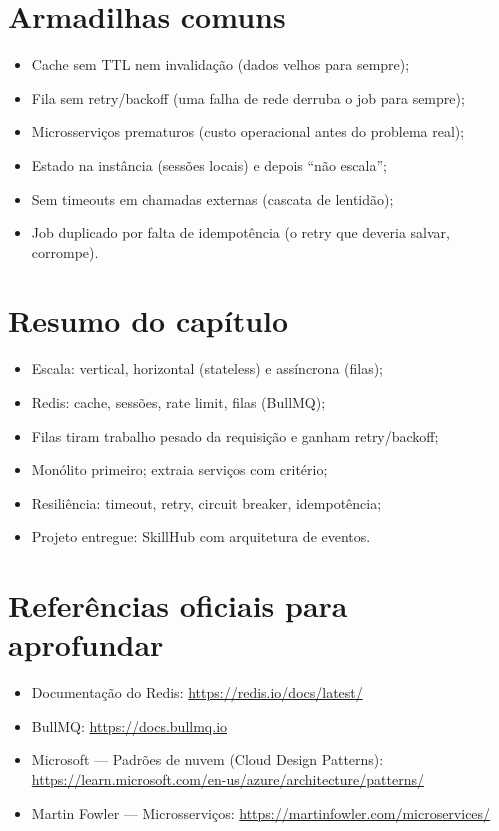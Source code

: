 \section{Armadilhas comuns}

\begin{itemize}[leftmargin=*, itemsep=0.4em]
  \item Cache sem TTL nem invalidação (dados velhos para sempre);
  \item Fila sem retry/backoff (uma falha de rede derruba o job para sempre);
  \item Microsserviços prematuros (custo operacional antes do problema real);
  \item Estado na instância (sessões locais) e depois ``não escala'';
  \item Sem timeouts em chamadas externas (cascata de lentidão);
  \item Job duplicado por falta de idempotência (o retry que deveria salvar, corrompe).
\end{itemize}

\section{Resumo do capítulo}

\begin{itemize}[leftmargin=*, itemsep=0.3em]
  \item Escala: vertical, horizontal (stateless) e assíncrona (filas);
  \item Redis: cache, sessões, rate limit, filas (BullMQ);
  \item Filas tiram trabalho pesado da requisição e ganham retry/backoff;
  \item Monólito primeiro; extraia serviços com critério;
  \item Resiliência: timeout, retry, circuit breaker, idempotência;
  \item Projeto entregue: SkillHub com arquitetura de eventos.
\end{itemize}

\section{Referências oficiais para aprofundar}

\begin{itemize}[leftmargin=*, itemsep=0.3em]
  \item Documentação do Redis: \url{https://redis.io/docs/latest/}
  \item BullMQ: \url{https://docs.bullmq.io}
  \item Microsoft — Padrões de nuvem (Cloud Design Patterns): \url{https://learn.microsoft.com/en-us/azure/architecture/patterns/}
  \item Martin Fowler — Microsserviços: \url{https://martinfowler.com/microservices/}
\end{itemize}
